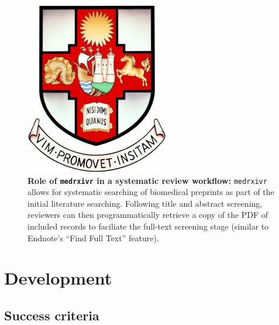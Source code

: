 \documentclass[a4paper, twoside]{templates/ociamthesis}
\begin{document}
\begin{figure}
\includegraphics[width=1\linewidth]{figures/UoBcrest} \caption[Role of \texttt{medrxivr} in a systematic review workflow]{\textbf{Role of \texttt{medrxivr} in a systematic review workflow:} \texttt{medrxivr} allows for systematic searching of biomedical preprints as part of the initial literature searching. Following title and abstract screening, reviewers can then programmatically retrieve a copy of the PDF of included records to faciliate the full-text screening stage (similar to Endnote's ``Find Full Text'' feature).}\label{fig:medrxivr-sr}
\end{figure}

\hypertarget{development}{%
\section{Development}\label{development}}

\hypertarget{success-criteria}{%
\subsection{Success criteria}\label{success-criteria}}
\end{document}
